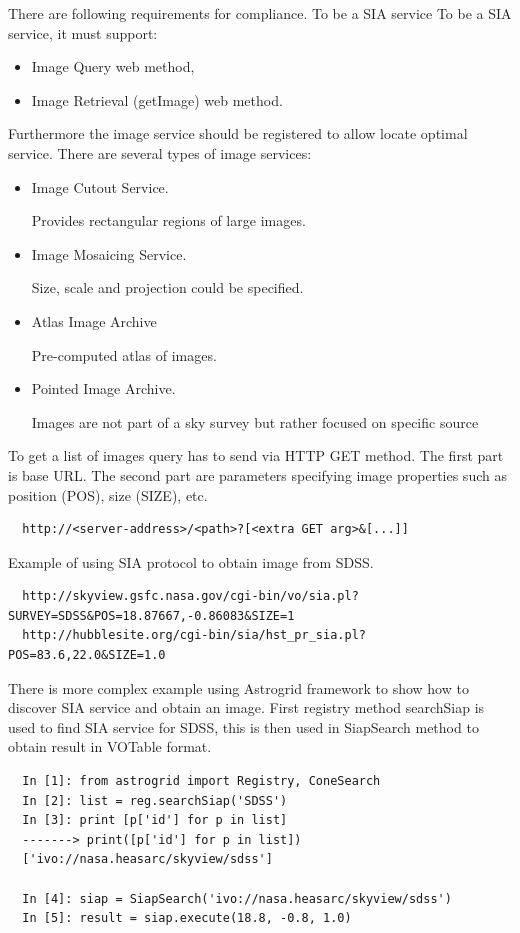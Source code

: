 There are following requirements for compliance. To be a SIA service
To be a SIA service, it must support:

\begin{itemize}
\item Image Query web method,
\item Image Retrieval (getImage) web method.
\end{itemize}

\noindent Furthermore the image service should be registered to allow locate
optimal service. There are several types of image services:

\begin{itemize}
\item Image Cutout Service.

  Provides rectangular regions of large images.
\item Image Mosaicing Service.

  Size, scale and projection could be specified.
\item Atlas Image Archive

  Pre-computed atlas of images.
\item Pointed Image Archive.  

  Images are not part of a sky survey but
  rather focused on specific source
\end{itemize}


To get a list of images query has to send via HTTP GET method. The
first part is base URL. The second part are parameters specifying image
properties such as position (POS), size (SIZE), etc.

\begin{lstlisting}
  http://<server-address>/<path>?[<extra GET arg>&[...]]
\end{lstlisting}

Example of using SIA protocol to obtain image from SDSS. 

\begin{lstlisting}
  http://skyview.gsfc.nasa.gov/cgi-bin/vo/sia.pl?SURVEY=SDSS&POS=18.87667,-0.86083&SIZE=1
  http://hubblesite.org/cgi-bin/sia/hst_pr_sia.pl?POS=83.6,22.0&SIZE=1.0
\end{lstlisting}

There is more complex example using Astrogrid framework to show how to
discover SIA service and obtain an image. First registry method
searchSiap is used to find SIA service for SDSS, this is then used in
SiapSearch method to obtain result in VOTable format.  

\begin{lstlisting}
  In [1]: from astrogrid import Registry, ConeSearch
  In [2]: list = reg.searchSiap('SDSS')
  In [3]: print [p['id'] for p in list]
  -------> print([p['id'] for p in list])
  ['ivo://nasa.heasarc/skyview/sdss']
  
  In [4]: siap = SiapSearch('ivo://nasa.heasarc/skyview/sdss')
  In [5]: result = siap.execute(18.8, -0.8, 1.0)
\end{lstlisting}

